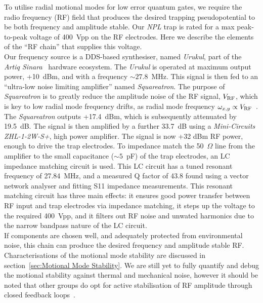     To utilise radial motional modes for low error quantum gates, we require the
    radio frequency (RF) field that produces the desired trapping
    pseudopotential to be both frequency and amplitude stable. Our \emph{NPL}
    trap is rated for a max peak-to-peak voltage of 400~Vpp on the RF
    electrodes. Here we describe the elements of the ``RF chain'' that supplies
    this voltage. \\
    Our frequency source is a DDS-based synthesiser, named \emph{Urukul}, part
    of the \emph{Artiq Sinara}~\cite{kasprowicz2020artiq} hardware ecosystem. The
    \emph{Urukul} is operated at maximum output power, +10~dBm, and with a frequency $\sim 27.8$~MHz. This
    signal is then fed to an ``ultra-low noise limiting amplifier'' named
    \emph{Squareatron}. The purpose of \emph{Squareatron} is to
    greatly reduce the amplitude noise of the RF signal, $V_{\rm RF}$, which is
    key to low radial mode frequency drifts, as radial mode frequency $\omega_{x,y} \propto V_{\rm RF}$~\cite{wineland1998experimental}. The \emph{Squareatron} outputs +17.4~dBm,
    which is subsequently attenuated by 19.5~dB. The signal is then amplified by a
    further 33.7~dB using a \emph{Mini-Circuits ZHL-1-2W-S+}, high power
    amplifier. The signal is now +32 dBm RF power, enough to drive the trap
    electrodes. To impedance match the 50~$\Omega$ line from the amplifier to
    the small capacitance ($\sim 5$~pF) of the trap electrodes, an LC
    impedance matching circuit is used. This LC circuit has a tuned resonant frequency of 27.84~MHz, and a
    measured Q factor of 43.8 found using a vector network analyser and fitting S11 impedance measurements.
    This resonant matching circuit has three main effects: it ensures good power transfer
    between RF input and trap electrodes via impedance matching, it steps up the
    voltage to the required 400~Vpp, and it filters out RF noise and unwated harmonics due to
    the narrow bandpass nature of the LC circuit. \\
    If components are chosen well, and adequately protected from
    environmental noise, this chain can produce the desired frequency and
    amplitude stable RF. Characterisations of the motional mode
    stability are discussed in section~\ref{sec:Motional Mode Stability}. We are
    still yet to fully quantify and debug the motional stability against thermal
    and mechanical noise, however it should be noted that other groups do opt
    for active stabilisation of RF amplitude through closed feedback loops~\cite{milne2021construction}.\\

